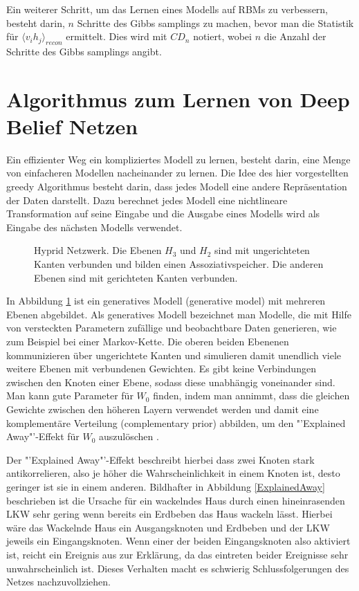 \documentclass[12pt]{article}
\begin{document}
Ein weiterer Schritt, um das Lernen eines Modells auf RBMs zu verbessern, besteht darin, $n$ Schritte des Gibbs samplings zu machen, bevor man die Statistik für $\langle v_i h_j \rangle_{recon}$ ermittelt. Dies wird mit $CD_n$ notiert, wobei $n$ die Anzahl der Schritte des Gibbs samplings angibt.

\section{Algorithmus zum Lernen von Deep Belief Netzen}
Ein effizienter Weg ein kompliziertes Modell zu lernen, besteht darin, eine Menge von einfacheren Modellen nacheinander zu lernen. Die Idee des hier vorgestellten greedy Algorithmus besteht darin, dass jedes Modell eine andere Repräsentation der Daten darstellt. Dazu berechnet jedes Modell eine nichtlineare Transformation auf seine Eingabe und die Ausgabe eines Modells wird als Eingabe des nächsten Modells verwendet. 

\begin{figure}[H]
	\center
	
	\caption{Hyprid Netzwerk. Die Ebenen $H_3$ und $H_2$ sind mit ungerichteten Kanten verbunden und bilden einen Assoziativspeicher. Die anderen Ebenen sind mit gerichteten Kanten verbunden.}
	\label{Netz}
\end{figure}

In Abbildung \ref{Netz} ist ein generatives Modell (generative model)  mit mehreren Ebenen abgebildet. Als generatives Modell bezeichnet man Modelle, die mit Hilfe von versteckten Parametern zufällige und  beobachtbare Daten generieren, wie zum Beispiel bei einer Markov-Kette. Die oberen beiden Ebenenen kommunizieren über ungerichtete Kanten und simulieren damit unendlich viele weitere Ebenen mit verbundenen Gewichten. Es gibt keine Verbindungen zwischen den Knoten einer Ebene, sodass diese unabhängig voneinander sind.  Man kann gute Parameter für $W_0$ finden, indem man annimmt, dass die gleichen Gewichte zwischen den höheren Layern verwendet werden und damit eine komplementäre Verteilung (complementary prior) abbilden, um den "'Explained Away"'-Effekt für $W_0$ auszulöschen \cite{learning}.

Der "'Explained Away"'-Effekt beschreibt hierbei dass zwei Knoten stark antikorrelieren, also je höher die Wahrscheinlichkeit in einem Knoten ist, desto geringer ist sie in einem anderen. 
Bildhafter in Abbildung \ref{ExplainedAway} beschrieben ist die Ursache für ein wackelndes Haus durch einen hineinrasenden LKW sehr gering wenn bereits ein Erdbeben das Haus wackeln lässt. Hierbei wäre das Wackelnde Haus ein Ausgangsknoten und Erdbeben und der LKW jeweils ein Eingangsknoten. Wenn einer der beiden Eingangsknoten also aktiviert ist, reicht ein Ereignis aus zur Erklärung, da das eintreten beider Ereignisse sehr unwahrscheinlich ist. Dieses Verhalten macht es schwierig Schlussfolgerungen des Netzes nachzuvollziehen. 
\end{document}
